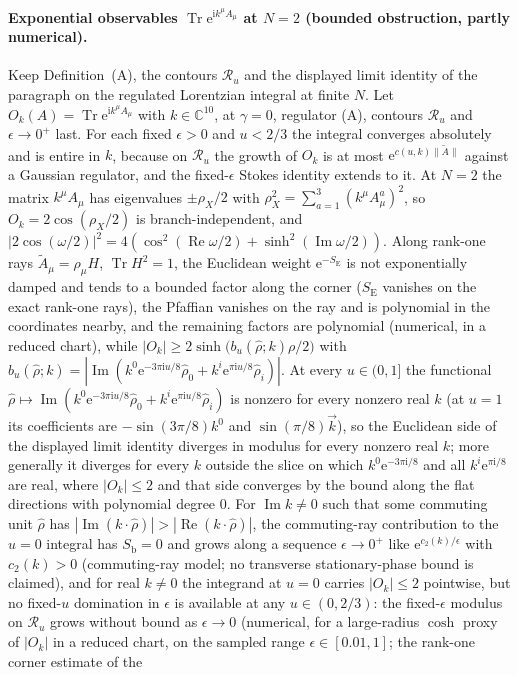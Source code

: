 \paragraph{Exponential observables \(\operatorname{Tr}\mathrm e^{\mathrm ik^\mu A_\mu}\) at \(N=2\) (bounded obstruction, partly numerical).}
Keep Definition~(A), the contours \(\mathcal R_u\) and the displayed limit identity of the paragraph on the regulated Lorentzian integral at finite \(N\). Let \(O_k(A)=\operatorname{Tr}\mathrm e^{\mathrm ik^\mu A_\mu}\) with \(k\in\mathbb C^{10}\), at \(\gamma=0\), regulator (A), contours \(\mathcal R_u\) and \(\epsilon\to0^+\) last. For each fixed \(\epsilon>0\) and \(u<2/3\) the integral converges absolutely and is entire in \(k\), because on \(\mathcal R_u\) the growth of \(O_k\) is at most \(\mathrm e^{c(u,k)\|\tilde A\|}\) against a Gaussian regulator, and the fixed-\(\epsilon\) Stokes identity extends to it. At \(N=2\) the matrix \(k^\mu A_\mu\) has eigenvalues \(\pm\rho_X/2\) with \(\rho_X^2=\sum_{a=1}^{3}(k^\mu A^a_\mu)^2\), so \(O_k=2\cos(\rho_X/2)\) is branch-independent, and \(|2\cos(\omega/2)|^2=4(\cos^2(\operatorname{Re}\omega/2)+\sinh^2(\operatorname{Im}\omega/2))\). Along rank-one rays \(\tilde A_\mu=\rho_\mu H\), \(\operatorname{Tr}H^2=1\), the Euclidean weight \(\mathrm e^{-S_{\mathrm E}}\) is not exponentially damped and tends to a bounded factor along the corner (\(S_{\mathrm E}\) vanishes on the exact rank-one rays), the Pfaffian vanishes on the ray and is polynomial in the coordinates nearby, and the remaining factors are polynomial (numerical, in a reduced chart), while \(|O_k|\ge 2\sinh\!\bigl(b_u(\hat\rho;k)\rho/2\bigr)\) with \(b_u(\hat\rho;k)=|\operatorname{Im}(k^0\mathrm e^{-3\pi\mathrm iu/8}\hat\rho_0+k^i\mathrm e^{\pi\mathrm iu/8}\hat\rho_i)|\). At every \(u\in(0,1]\) the functional \(\hat\rho\mapsto\operatorname{Im}(k^0\mathrm e^{-3\pi\mathrm iu/8}\hat\rho_0+k^i\mathrm e^{\pi\mathrm iu/8}\hat\rho_i)\) is nonzero for every nonzero real \(k\) (at \(u=1\) its coefficients are \(-\sin(3\pi/8)k^0\) and \(\sin(\pi/8)\vec k\)), so the Euclidean side of the displayed limit identity diverges in modulus for every nonzero real \(k\); more generally it diverges for every \(k\) outside the slice on which \(k^0\mathrm e^{-3\pi\mathrm i/8}\) and all \(k^i\mathrm e^{\pi\mathrm i/8}\) are real, where \(|O_k|\le2\) and that side converges by the bound along the flat directions with polynomial degree \(0\). For \(\operatorname{Im}k\ne0\) such that some commuting unit \(\hat\rho\) has \(|\operatorname{Im}(k\cdot\hat\rho)|>|\operatorname{Re}(k\cdot\hat\rho)|\), the commuting-ray contribution to the \(u=0\) integral has \(S_{\mathrm b}=0\) and grows along a sequence \(\epsilon\to0^+\) like \(\mathrm e^{c_2(k)/\epsilon}\) with \(c_2(k)>0\) (commuting-ray model; no transverse stationary-phase bound is claimed), and for real \(k\ne0\) the integrand at \(u=0\) carries \(|O_k|\le2\) pointwise, but no fixed-\(u\) domination in \(\epsilon\) is available at any \(u\in(0,2/3)\): the fixed-\(\epsilon\) modulus on \(\mathcal R_u\) grows without bound as \(\epsilon\to0\) (numerical, for a large-radius \(\cosh\) proxy of \(|O_k|\) in a reduced chart, on the sampled range \(\epsilon\in[0.01,1]\); the rank-one corner estimate of the 